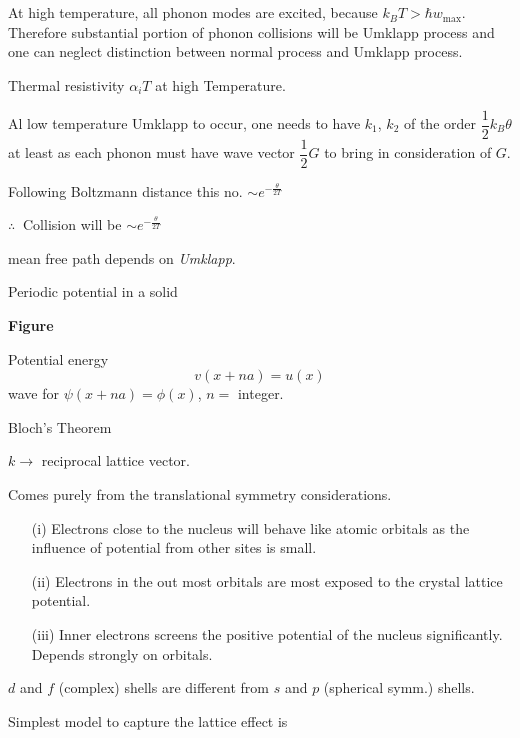 \chapter{}\label{lec21}

At high temperature, all phonon modes are excited, because $k_{B}T>\hbar w_{\max}$. Therefore substantial portion of phonon collisions will be Umklapp process and one can neglect distinction between normal process and Umklapp process.

Thermal resistivity $\alpha_{i}T$ at high Temperature.

Al low temperature Umklapp to occur, one needs to have $k_{1}$, $k_{2}$ of the order $\dfrac{1}{2}k_{B}\theta$ at least as each phonon must have wave vector $\dfrac{1}{2}G$ to bring in consideration of $G$.

Following Boltzmann distance this no. $\sim e^{-\frac{\theta}{2T}}$

$\therefore \ $ Collision will be $\sim e^{-\frac{\theta}{2T}}$

mean free path depends on {\em Umklapp}.

Periodic potential in a solid
\begin{center}
{\bf Figure}
\end{center}

Potential energy
$$
v(x+na)=u(x)
$$
wave for $\psi(x+na)=\phi(x)$, $n=$ integer.

Bloch's Theorem 

$k\to$ reciprocal lattice vector.

Comes purely from the translational symmetry considerations.
\begin{itemize}
\item[(i)] Electrons close to the nucleus will behave like atomic orbitals as the influence of potential from other sites is small.

\item[(ii)] Electrons in the out most orbitals are most exposed to the crystal lattice potential.

\item[(iii)] Inner electrons screens the positive potential of the nucleus significantly. Depends strongly on orbitals.
\end{itemize}

$d$ and $f$ (complex) shells are different from $s$ and $p$ (spherical symm.) shells.

Simplest model to capture the lattice effect is


